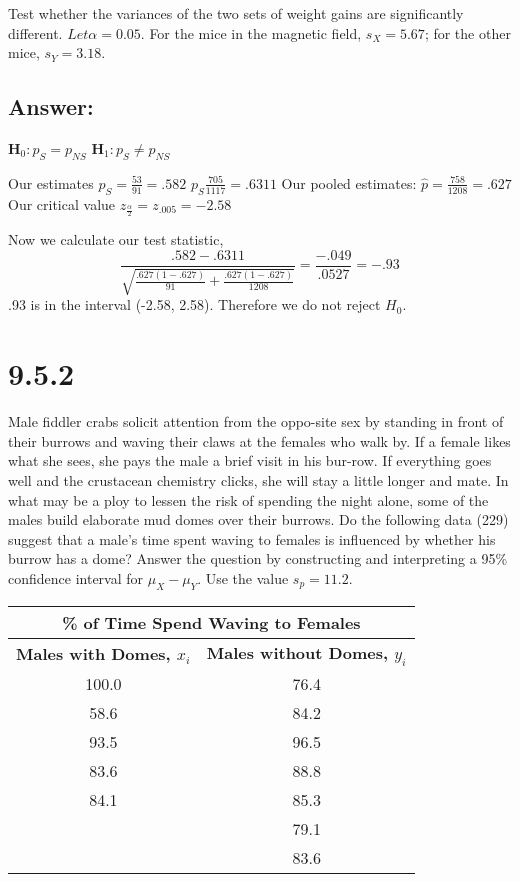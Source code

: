 \documentclass[svgnames]{article}
\begin{document}
Test whether the variances of the two sets of weight gains are significantly different. $Let \alpha = 0.05$. For the mice in the magnetic field, $s_X = 5.67$; for the other mice, $s_Y = 3.18$.

\subsection*{Answer:}
\textbf{H$_0: p_{S} = p_{NS} $}
\newline
\textbf{H$_1: p_{S} \neq p_{NS}$}
\newline

Our estimates\newline
$p_{S}  = \frac{53}{91}=.582$ \newline $ p_{S} \frac{705}{1117}=.6311$
\newline
Our pooled estimates:
$\hat{p} = \frac{758}{1208}=.627$
\newline
Our critical value $z_{\frac{\alpha}{2}}=z_{.005}=-2.58$

Now we calculate our test statistic,
$$\frac{.582 - .6311}{\sqrt{\frac{.627(1-.627)}{91} + \frac{.627(1-.627)}{1208}}}=\frac{-.049}{.0527}=-.93$$
.93 is in the interval (-2.58, 2.58). Therefore we do not reject $H_0$.


\section{9.5.2}

Male fiddler crabs solicit attention from the oppo-site sex by standing in front of their burrows and waving their claws at the females who walk by. If a female likes what she sees, she pays the male a brief visit in his bur-row. If everything goes well and the crustacean chemistry clicks, she will stay a little longer and mate. In what may be a ploy to lessen the risk of spending the night alone, some of the males build elaborate mud domes over their burrows. Do the following data (229) suggest that a male’s time spent waving to females is influenced by whether his burrow has a dome? Answer the question by constructing and interpreting a 95\% confidence interval for $\mu_X - \mu_Y$. Use the value $s_p = 11.2$.


\begin{table}[H]
\centering
 \begin{tabular}{c c} 
 \hline
\multicolumn{2}{c}{\bf \% of Time Spend Waving to Females}\\
\hline 
\bf  Males with Domes, $x_i$ & \bf  Males without Domes, $y_i$  \\
\hline
100.0 & 76.4  \\
58.6 &  84.2  \\
93.5 & 96.5  \\
83.6 &  88.8  \\
84.1 & 85.3  \\
 &  79.1  \\
 & 83.6  \\
 \hline
 \end{tabular}
\end{table}
\end{document}

